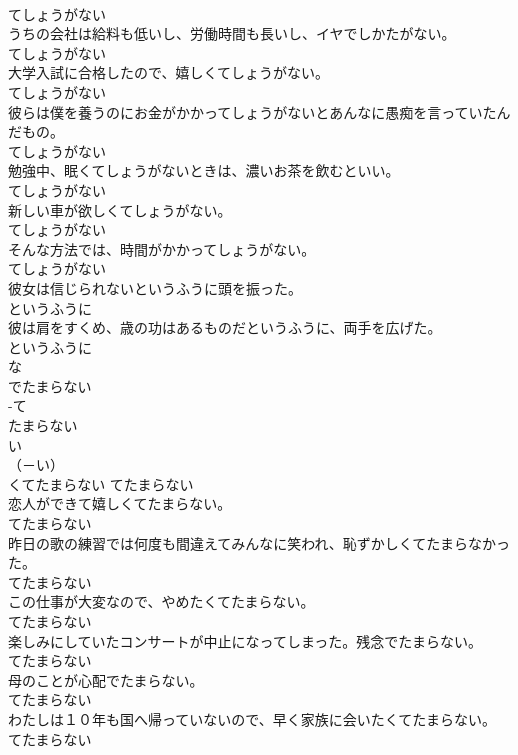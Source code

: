 \documentclass[8pt]{extreport}
\begin{document}
\begin{CJK}{UTF8}{min}
\\	てしょうがない	
\\	うちの会社は給料も低いし、労働時間も長いし、イヤでしかたがない。	
\\	てしょうがない	
\\	大学入試に合格したので、嬉しくてしょうがない。	
\\	てしょうがない	
\\	彼らは僕を養うのにお金がかかってしょうがないとあんなに愚痴を言っていたんだもの。	
\\	てしょうがない	
\\	勉強中、眠くてしょうがないときは、濃いお茶を飲むといい。	
\\	てしょうがない	
\\	新しい車が欲しくてしょうがない。	
\\	てしょうがない	
\\	そんな方法では、時間がかかってしょうがない。	
\\	てしょうがない	
\\	彼女は信じられないというふうに頭を振った。	
\\	というふうに	
\\	彼は肩をすくめ、歳の功はあるものだというふうに、両手を広げた。	
\\	というふうに	
\\	な
\\	でたまらない	
\\	-て
\\	たまらない	
\\	い
\\	（－い） 
\\	くてたまらない	てたまらない	
\\	恋人ができて嬉しくてたまらない。	
\\	てたまらない	
\\	昨日の歌の練習では何度も間違えてみんなに笑われ、恥ずかしくてたまらなかった。	
\\	てたまらない	
\\	この仕事が大変なので、やめたくてたまらない。	
\\	てたまらない	
\\	楽しみにしていたコンサートが中止になってしまった。残念でたまらない。	
\\	てたまらない	
\\	母のことが心配でたまらない。	
\\	てたまらない	
\\	わたしは１０年も国へ帰っていないので、早く家族に会いたくてたまらない。	
\\	てたまらない	

\end{CJK}
\end{document}
